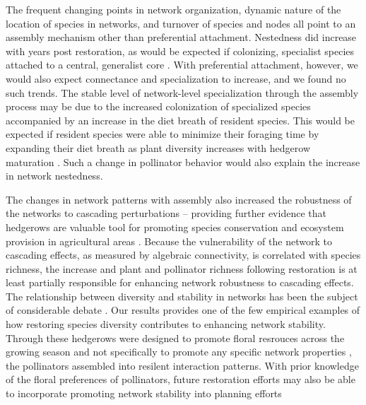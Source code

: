 \documentclass[12pt]{article}
\begin{document}
The frequent changing points in network organization, dynamic nature
of the location of species in networks, and turnover of species and
nodes all point to an assembly mechanism other than preferential
attachment. Nestedness did increase with years post restoration, as
would be expected if colonizing, specialist species attached to a
central, generalist core \cite{albrecht2010plant}. With preferential
attachment, however, we would also expect connectance and
specialization to increase, and we found no such trends. The stable
level of network-level specialization through the assembly process may
be due to the increased colonization of specialized species
\citep{mgonigle-2015-x} accompanied by an increase in the diet breath
of resident species. This would be expected if resident species were
able to minimize their foraging time by expanding their diet breath as
plant diversity increases with hedgerow maturation \citep{Waser1996,
  pyke1984optimal, Bluthgen2007, albrecht2010plant}. Such a change in
pollinator behavior would also explain the increase in network
nestedness.

The changes in network patterns with assembly also increased the
robustness of the networks to cascading perturbations -- providing
further evidence that hedgerows are valuable tool for promoting
species conservation and ecosystem provision in agricultural areas
\citep{mgonigle-2015-x, ponisio2015farm, kremen-2015-602}. Because the
vulnerability of the network to cascading effects, as measured by
algebraic connectivity, is correlated with species richness, the
increase and plant and pollinator richness following restoration is at
least partially responsible for enhancing network robustness to
cascading effects. The relationship between diversity and stability in
networks has been the subject of considerable debate
\citep[e.g.,][]{may1972will, pimm1984complexity,
  montoya2006ecological}. Our results provides one of the few
empirical examples of how restoring species diversity contributes to
enhancing network stability. Through these hedgerows were designed to
promote floral resrouces across the growing season and not
specifically to promote any specific network properties
\citep{menz-2010-4}, the pollinators assembled into resilent
interaction patterns. With prior knowledge of the floral preferences
of pollinators, future restoration efforts may also be able to
incorporate promoting network stability into planning efforts
\citep{mgonigle2016tool}
 
 
\end{document}

